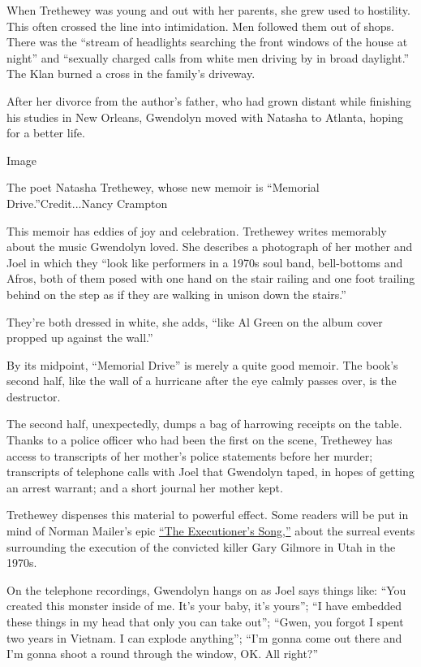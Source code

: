 When Trethewey was young and out with her parents, she grew used to
hostility. This often crossed the line into intimidation. Men followed
them out of shops. There was the ``stream of headlights searching the
front windows of the house at night'' and ``sexually charged calls from
white men driving by in broad daylight.'' The Klan burned a cross in the
family's driveway.

After her divorce from the author's father, who had grown distant while
finishing his studies in New Orleans, Gwendolyn moved with Natasha to
Atlanta, hoping for a better life.

Image

The poet Natasha Trethewey, whose new memoir is ``Memorial
Drive.''Credit...Nancy Crampton

This memoir has eddies of joy and celebration. Trethewey writes
memorably about the music Gwendolyn loved. She describes a photograph of
her mother and Joel in which they ``look like performers in a 1970s soul
band, bell-bottoms and Afros, both of them posed with one hand on the
stair railing and one foot trailing behind on the step as if they are
walking in unison down the stairs.''

They're both dressed in white, she adds, ``like Al Green on the album
cover propped up against the wall.''

By its midpoint, ``Memorial Drive'' is merely a quite good memoir. The
book's second half, like the wall of a hurricane after the eye calmly
passes over, is the destructor.

The second half, unexpectedly, dumps a bag of harrowing receipts on the
table. Thanks to a police officer who had been the first on the scene,
Trethewey has access to transcripts of her mother's police statements
before her murder; transcripts of telephone calls with Joel that
Gwendolyn taped, in hopes of getting an arrest warrant; and a short
journal her mother kept.

Trethewey dispenses this material to powerful effect. Some readers will
be put in mind of Norman Mailer's epic
\href{https://archive.nytimes.com/www.nytimes.com/books/97/05/04/reviews/mailer-song.html}{``The
Executioner's Song,''} about the surreal events surrounding the
execution of the convicted killer Gary Gilmore in Utah in the 1970s.

On the telephone recordings, Gwendolyn hangs on as Joel says things
like: ``You created this monster inside of me. It's your baby, it's
yours''; ``I have embedded these things in my head that only you can
take out''; ``Gwen, you forgot I spent two years in Vietnam. I can
explode anything''; ``I'm gonna come out there and I'm gonna shoot a
round through the window, OK. All right?''

